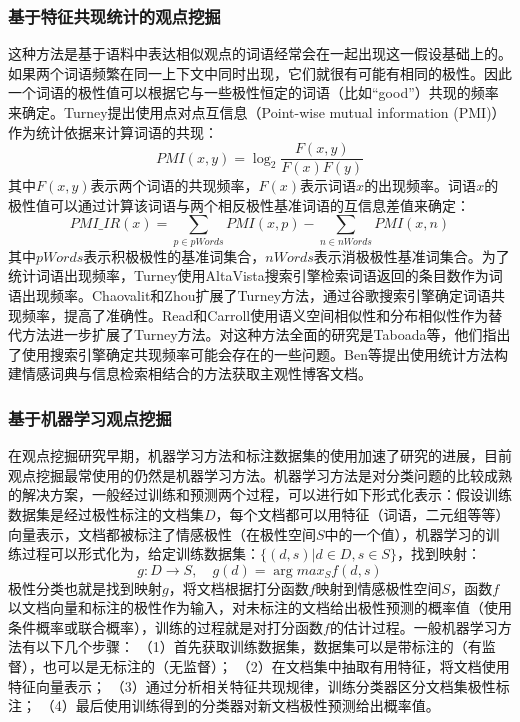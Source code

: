 \subsubsection{基于特征共现统计的观点挖掘}
这种方法是基于语料中表达相似观点的词语经常会在一起出现这一假设基础上的。如果两个词语频繁在同一上下文中同时出现，它们就很有可能有相同的极性。因此一个词语的极性值可以根据它与一些极性恒定的词语（比如“good”）共现的频率来确定。Turney提出使用点对点互信息（Point-wise mutual information (PMI)）作为统计依据来计算词语的共现：
\begin{equation}
PMI(x,y)=\log_2\dfrac{F(x,y)}{F(x)F(y)}
\end{equation}
其中$ F(x,y) $表示两个词语的共现频率，$ F(x) $表示词语$ x $的出现频率。词语$ x $的极性值可以通过计算该词语与两个相反极性基准词语的互信息差值来确定：
\begin{equation}
PMI\_IR(x)=\sum_{p \in pWords}PMI(x,p)-\sum_{n \in nWords}PMI(x,n)
\end{equation}
其中$ pWords $表示积极极性的基准词集合，$ nWords $表示消极极性基准词集合。为了统计词语出现频率，Turney使用AltaVista搜索引擎检索词语返回的条目数作为词语出现频率。Chaovalit和Zhou扩展了Turney方法，通过谷歌搜索引擎确定词语共现频率，提高了准确性。Read和Carroll使用语义空间相似性和分布相似性作为替代方法进一步扩展了Turney方法。对这种方法全面的研究是Taboada等，他们指出了使用搜索引擎确定共现频率可能会存在的一些问题。Ben等提出使用统计方法构建情感词典与信息检索相结合的方法获取主观性博客文档。

\subsubsection{基于机器学习观点挖掘}
在观点挖掘研究早期，机器学习方法和标注数据集的使用加速了研究的进展，目前观点挖掘最常使用的仍然是机器学习方法。机器学习方法是对分类问题的比较成熟的解决方案，一般经过训练和预测两个过程，可以进行如下形式化表示：假设训练数据集是经过极性标注的文档集$D$，每个文档都可以用特征（词语，二元组等等）向量表示，文档都被标注了情感极性（在极性空间$S$中的一个值），机器学习的训练过程可以形式化为，给定训练数据集：$ \{(d,s)|d \in D,s \in S\} $，找到映射：
\begin{equation}
g:D \rightarrow S,\quad g(d)=\arg max_S f(d,s)
\end{equation}
极性分类也就是找到映射$ g $，将文档根据打分函数$ f $映射到情感极性空间$ S $，函数$ f $以文档向量和标注的极性作为输入，对未标注的文档给出极性预测的概率值（使用条件概率或联合概率），训练的过程就是对打分函数$ f $的估计过程。一般机器学习方法有以下几个步骤：
（1）首先获取训练数据集，数据集可以是带标注的（有监督），也可以是无标注的（无监督）；
（2）在文档集中抽取有用特征，将文档使用特征向量表示；
（3）通过分析相关特征共现规律，训练分类器区分文档集极性标注；
（4）最后使用训练得到的分类器对新文档极性预测给出概率值。


